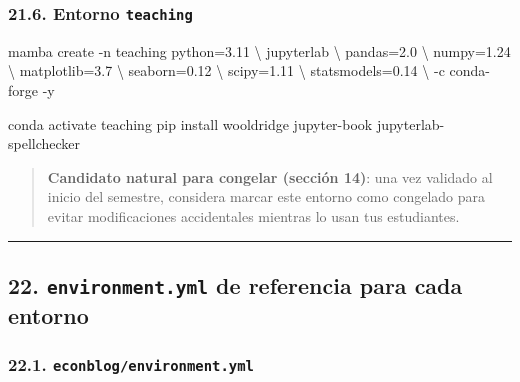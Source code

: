 \documentclass[
  doc,
  floatsintext,
  longtable,
  a4paper,
  nolmodern,
  notxfonts,
  notimes,
  12pt,
  colorlinks=true,linkcolor=blue,citecolor=blue,urlcolor=blue]{apa7}
\newenvironment{Shaded}{\begin{snugshade}}{\end{snugshade}}
\newcommand{\AttributeTok}[1]{\textcolor[rgb]{0.40,0.45,0.13}{#1}}
\newcommand{\DataTypeTok}[1]{\textcolor[rgb]{0.68,0.00,0.00}{#1}}
\newcommand{\ExtensionTok}[1]{\textcolor[rgb]{0.00,0.23,0.31}{#1}}
\newcommand{\NormalTok}[1]{\textcolor[rgb]{0.00,0.23,0.31}{#1}}
\begin{document}
\subsubsection{\texorpdfstring{21.6. Entorno
\texttt{teaching}}{21.6. Entorno teaching}}\label{entorno-teaching}

\begin{Shaded}
\begin{Highlighting}[]
\ExtensionTok{mamba}\NormalTok{ create }\AttributeTok{{-}n}\NormalTok{ teaching python=3.11 }\DataTypeTok{\textbackslash{}}
\NormalTok{  jupyterlab }\DataTypeTok{\textbackslash{}}
\NormalTok{  pandas=2.0 }\DataTypeTok{\textbackslash{}}
\NormalTok{  numpy=1.24 }\DataTypeTok{\textbackslash{}}
\NormalTok{  matplotlib=3.7 }\DataTypeTok{\textbackslash{}}
\NormalTok{  seaborn=0.12 }\DataTypeTok{\textbackslash{}}
\NormalTok{  scipy=1.11 }\DataTypeTok{\textbackslash{}}
\NormalTok{  statsmodels=0.14 }\DataTypeTok{\textbackslash{}}
  \AttributeTok{{-}c}\NormalTok{ conda{-}forge }\AttributeTok{{-}y}

\ExtensionTok{conda}\NormalTok{ activate teaching}
\ExtensionTok{pip}\NormalTok{ install wooldridge jupyter{-}book jupyterlab{-}spellchecker}
\end{Highlighting}
\end{Shaded}

\begin{quote}
\textbf{Candidato natural para congelar (sección 14)}: una vez validado
al inicio del semestre, considera marcar este entorno como congelado
para evitar modificaciones accidentales mientras lo usan tus
estudiantes.
\end{quote}

\begin{center}\rule{0.5\linewidth}{0.5pt}\end{center}

\subsection{\texorpdfstring{22. \texttt{environment.yml} de referencia
para cada
entorno}{22. environment.yml de referencia para cada entorno}}\label{environment.yml-de-referencia-para-cada-entorno}

\subsubsection{\texorpdfstring{22.1.
\texttt{econblog/environment.yml}}{22.1. econblog/environment.yml}}\label{econblogenvironment.yml}
\end{document}
